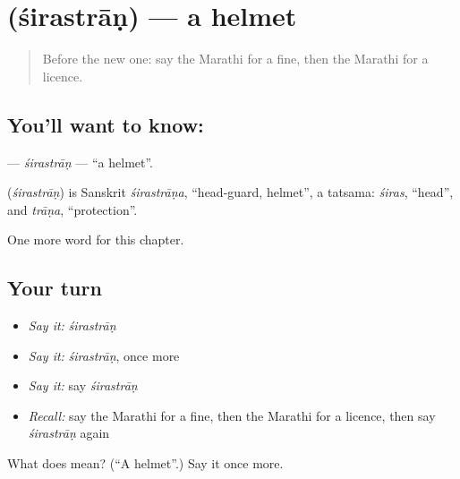 \section[\texorpdfstring{\mr{शिरस्त्राण} (śirastrāṇ)}{शिरस्त्राण (śirastrāṇ)}]{ (śirastrāṇ) — a helmet}

\label{lesson:MR-C266-sirastran}



\begin{quote}
Before the new one: say the Marathi for a fine, then the Marathi for a licence.
\end{quote}

\subsection*{You'll want to know: }
\textbf{} — \emph{śirastrāṇ} — \textquotedblleft{}a helmet\textquotedblright{}.

\begin{cousinweb}
\textbf{} (\emph{śirastrāṇ}) is Sanskrit \emph{śirastrāṇa}, \textquotedblleft{}head-guard, helmet\textquotedblright{}, a tatsama: \emph{śiras}, \textquotedblleft{}head\textquotedblright{}, and \emph{trāṇa}, \textquotedblleft{}protection\textquotedblright{}.
\end{cousinweb}

\begin{grammarlens}[title={What you've built}]
One more word for this chapter.
\end{grammarlens}

\subsection*{Your turn}
\begin{itemize}
\raggedright
  \item \emph{Say it:} \emph{śirastrāṇ}
  \item \emph{Say it:} \emph{śirastrāṇ}, once more
  \item \emph{Say it:} say \emph{śirastrāṇ}
  \item \emph{Recall:} say the Marathi for a fine, then the Marathi for a licence, then say \emph{śirastrāṇ} again
\end{itemize}

\begin{tcolorbox}[breakable,colback=teal!4,colframe=teal!35!black,title={Before you move on}]
What does  mean? (\textquotedblleft{}A helmet\textquotedblright{}.) Say it once more.
\end{tcolorbox}
